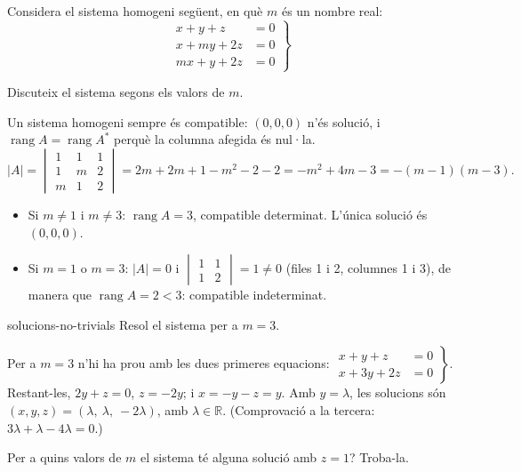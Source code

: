 Considera el sistema homogeni següent, en què $m$ és un nombre real:
\[
\left.\begin{aligned}
x+y+z&=0\\
x+my+2z&=0\\
mx+y+2z&=0
\end{aligned}\right\}
\]

\begin{apartats}

Discuteix el sistema segons els valors de $m$.

\begin{solucio}
Un sistema homogeni sempre és compatible: $(0,0,0)$ n'és solució, i $\operatorname{rang}A=\operatorname{rang}A^*$
perquè la columna afegida és nul·la.
\[
|A|=\begin{vmatrix}1&1&1\\1&m&2\\m&1&2\end{vmatrix}=2m+2m+1-m^2-2-2=-m^2+4m-3=-(m-1)(m-3).
\]
\begin{itemize}
\item Si $m\ne1$ i $m\ne3$: $\operatorname{rang}A=3$, compatible determinat. L'única solució és
$(0,0,0)$.
\item Si $m=1$ o $m=3$: $|A|=0$ i $\begin{vmatrix}1&1\\1&2\end{vmatrix}=1\ne0$ (files 1 i 2, columnes 1
i 3), de manera que $\operatorname{rang}A=2<3$: compatible indeterminat.
\end{itemize}
\end{solucio}

\begin{tria}{solucions-no-trivials}
Resol el sistema per a $m=3$.

\begin{solucio}
Per a $m=3$ n'hi ha prou amb les dues primeres equacions:
$\left.\begin{aligned}x+y+z&=0\\x+3y+2z&=0\end{aligned}\right\}$. Restant-les, $2y+z=0$, $z=-2y$; i
$x=-y-z=y$. Amb $y=\lambda$, les solucions són $(x,y,z)=(\lambda,\ \lambda,\ -2\lambda)$, amb
$\lambda\in\mathbb R$. (Comprovació a la tercera: $3\lambda+\lambda-4\lambda=0$.)
\end{solucio}

Per a quins valors de $m$ el sistema té alguna solució amb $z=1$? Troba-la.


\end{tria}
\end{apartats}
